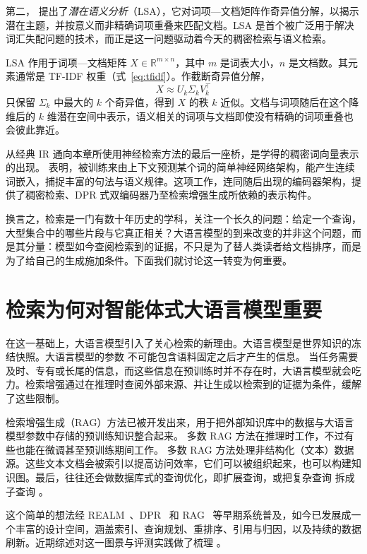第二，\citet{deerwester1990indexing} 提出了\emph{潜在语义分析}（LSA），它对词项—文档矩阵作奇异值分解，以揭示潜在主题，并按意义而非精确词项重叠来匹配文档。LSA 是首个被广泛用于解决词汇失配问题的技术，而正是这一问题驱动着今天的稠密检索与语义检索。

LSA 作用于词项—文档矩阵 $X \in \mathbb{R}^{m \times n}$，其中 $m$ 是词表大小，$n$ 是文档数。其元素通常是 TF-IDF 权重（式~\ref{eq:tfidf}）。作截断奇异值分解，
\begin{equation}
X \approx U_k \Sigma_k V_k^{\top}
\label{eq:lsa}
\end{equation}
只保留 $\Sigma_k$ 中最大的 $k$ 个奇异值，得到 $X$ 的秩 $k$ 近似。文档与词项随后在这个降维后的 $k$ 维潜在空间中表示，语义相关的词项与文档即使没有精确的词项重叠也会彼此靠近。


从经典 IR 通向本章所使用神经检索方法的最后一座桥，是学得的稠密词向量表示的出现。\citet{mikolov2013efficient} 表明，被训练来由上下文预测某个词的简单神经网络架构，能产生连续词嵌入，捕捉丰富的句法与语义规律。这项工作，连同随后出现的编码器架构，提供了稠密检索、DPR 式双编码器乃至检索增强生成所依赖的表示构件。

换言之，检索是一门有数十年历史的学科，关注一个长久的问题：给定一个查询，大型集合中的哪些片段与它真正相关？大语言模型的到来改变的并非这个问题，而是其分量：模型如今查阅检索到的证据，不只是为了替人类读者给文档排序，而是为了给自己的生成施加条件。下面我们就讨论这一转变为何重要。


\section{检索为何对智能体式大语言模型重要}
在这一基础上，大语言模型引入了关心检索的新理由。大语言模型是世界知识的冻结快照。大语言模型的参数
不可能包含语料固定之后才产生的信息。
当任务需要及时、专有或长尾的信息，而这些信息在预训练时并不存在时，大语言模型就会吃力。检索增强通过在推理时查阅外部来源、并让生成以检索到的证据为条件，缓解了这些限制。

检索增强生成（RAG）方法已被开发出来，用于把外部知识库中的数据与大语言模型参数中存储的预训练知识整合起来。
多数 RAG 方法在推理时工作，不过有些也能在微调甚至预训练期间工作。
多数 RAG 方法处理非结构化（文本）数据源。这些文本文档会被索引以提高访问效率，它们可以被组织起来，也可以构建知识图。最后，往往还会做数据库式的查询优化，即扩展查询，或把复杂查询
拆成子查询 \citep{cong2024query}。

这个简单的想法经 REALM~\citep{guu2020realm}、DPR~\citep{karpukhin2020dense} 和 RAG~\citep{lewis2020retrieval} 等早期系统普及，如今已发展成一个丰富的设计空间，涵盖索引、查询规划、重排序、引用与归因，以及持续的数据刷新。近期综述对这一图景与评测实践做了梳理 \citep{gao2023rag_survey,huang2024rag_survey,yu2024rag_eval,sharma2025rag_survey,peng2024graphrag_survey}。




